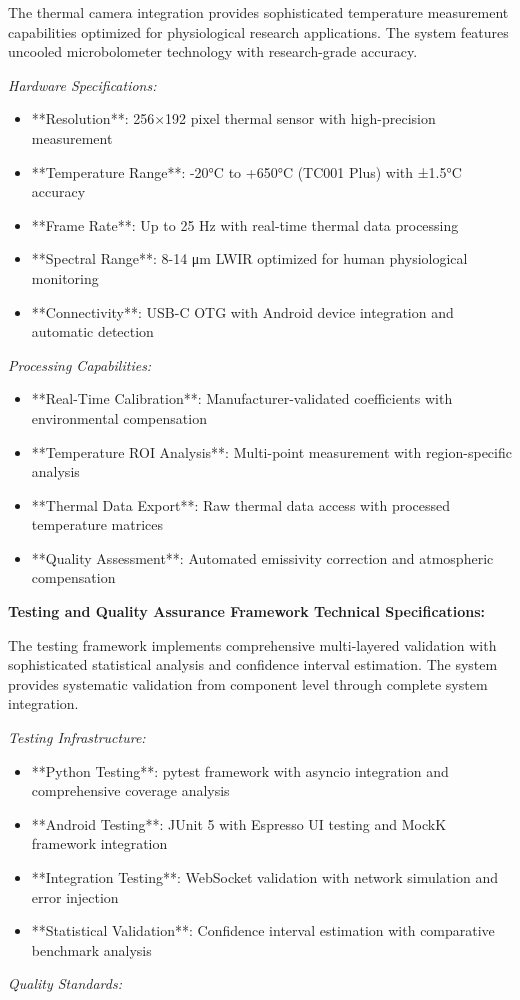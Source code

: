 \documentclass[12pt,a4paper]{article}
\begin{document}
The thermal camera integration provides sophisticated temperature measurement capabilities optimized for physiological
research applications. The system features uncooled microbolometer technology with research-grade accuracy.

\textit{Hardware Specifications:}

\begin{itemize}
\item **Resolution**: 256×192 pixel thermal sensor with high-precision measurement
\item **Temperature Range**: -20°C to +650°C (TC001 Plus) with ±1.5°C accuracy
\item **Frame Rate**: Up to 25 Hz with real-time thermal data processing
\item **Spectral Range**: 8-14 μm LWIR optimized for human physiological monitoring
\item **Connectivity**: USB-C OTG with Android device integration and automatic detection

\end{itemize}
\textit{Processing Capabilities:}

\begin{itemize}
\item **Real-Time Calibration**: Manufacturer-validated coefficients with environmental compensation
\item **Temperature ROI Analysis**: Multi-point measurement with region-specific analysis
\item **Thermal Data Export**: Raw thermal data access with processed temperature matrices
\item **Quality Assessment**: Automated emissivity correction and atmospheric compensation

\end{itemize}
\textbf{Testing and Quality Assurance Framework Technical Specifications:}

The testing framework implements comprehensive multi-layered validation with sophisticated statistical analysis and
confidence interval estimation. The system provides systematic validation from component level through complete system
integration.

\textit{Testing Infrastructure:}

\begin{itemize}
\item **Python Testing**: pytest framework with asyncio integration and comprehensive coverage analysis
\item **Android Testing**: JUnit 5 with Espresso UI testing and MockK framework integration
\item **Integration Testing**: WebSocket validation with network simulation and error injection
\item **Statistical Validation**: Confidence interval estimation with comparative benchmark analysis

\end{itemize}
\textit{Quality Standards:}
\end{document}
